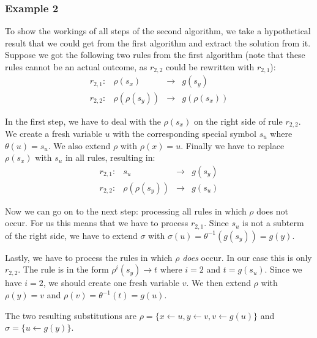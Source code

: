 \subsubsection*{Example 2}
To show the workings of all steps of the second algorithm, we take a hypothetical result that we could get from the first algorithm and extract the solution from it. Suppose we got the following two rules from the first algorithm (note that these rules cannot be an actual outcome, as $r_{2,2}$ could be rewritten with $r_{2,1}$):
$$
\begin{array}{lrcl}
    r_{2,1}: & \rho(s_x) & \rightarrow & g(s_y) \\
    r_{2,2}: & \rho(\rho(s_y)) & \rightarrow & g(\rho(s_x))
\end{array}
$$

In the first step, we have to deal with the $\rho(s_x)$ on the right side of rule $r_{2,2}$. We create a fresh variable $u$ with the corresponding special symbol $s_u$ where $\theta(u) = s_u$. We also extend $\rho$ with $\rho(x) = u$. Finally we have to replace $\rho(s_x)$ with $s_u$ in all rules, resulting in:
$$
\begin{array}{lrcl}
    r_{2,1}: & s_u & \rightarrow & g(s_y) \\
    r_{2,2}: & \rho(\rho(s_y)) & \rightarrow & g(s_u)
\end{array}
$$

Now we can go on to the next step: processing all rules in which $\rho$ does not occur. For us this means that we have to process $r_{2,1}$. Since $s_u$ is not a subterm of the right side, we have to extend $\sigma$ with $\sigma(u) = \theta^{-1}(g(s_y)) = g(y)$. 

Lastly, we have to process the rules in which $\rho$ \textit{does} occur. In our case this is only $r_{2,2}$. The rule is in the form $\rho^i(s_y) \rightarrow t$ where $i = 2$ and $t = g(s_u)$. Since we have $i = 2$, we should create one fresh variable $v$. We then extend $\rho$ with $\rho(y) = v$ and $\rho(v) = \theta^{-1}(t) = g(u)$. 

The two resulting substitutions are $\rho = \{ x \leftarrow u, y \leftarrow v, v \leftarrow g(u) \}$ and $\sigma = \{ u \leftarrow g(y) \}$.